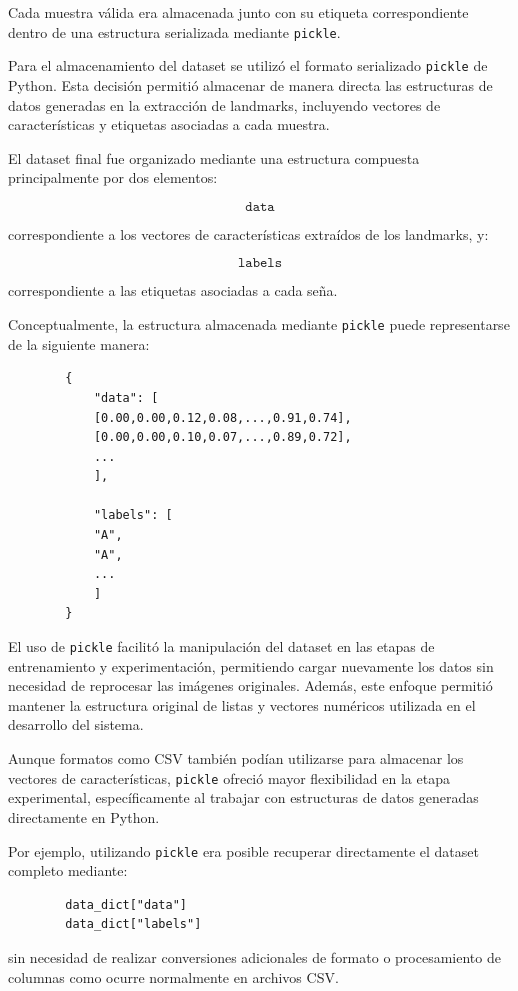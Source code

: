 	Cada muestra válida era almacenada junto con su etiqueta correspondiente dentro
	de una estructura serializada mediante \texttt{pickle}. 
	
	Para el almacenamiento del dataset se utilizó el formato serializado
	\texttt{pickle} de Python. Esta decisión permitió almacenar de manera directa
	las estructuras de datos generadas en la extracción de landmarks,
	incluyendo vectores de características y etiquetas asociadas a cada muestra.
	
	El dataset final fue organizado mediante una estructura compuesta
	principalmente por dos elementos:
	
	\[
	\texttt{data}
	\]
	
	correspondiente a los vectores de características extraídos de los landmarks, y:
	
	\[
	\texttt{labels}
	\]
	
	correspondiente a las etiquetas asociadas a cada seña.
	
	Conceptualmente, la estructura almacenada mediante \texttt{pickle} puede
	representarse de la siguiente manera:
	
	\begin{verbatim}
		{
			"data": [
			[0.00,0.00,0.12,0.08,...,0.91,0.74],
			[0.00,0.00,0.10,0.07,...,0.89,0.72],
			...
			],
			
			"labels": [
			"A",
			"A",
			...
			]
		}
	\end{verbatim}
	
	El uso de \texttt{pickle} facilitó la manipulación del dataset en las etapas
	de entrenamiento y experimentación, permitiendo cargar nuevamente los datos sin
	necesidad de reprocesar las imágenes originales. Además, este enfoque permitió
	mantener la estructura original de listas y vectores numéricos utilizada en 
	el desarrollo del sistema.
	
	Aunque formatos como CSV también podían utilizarse para almacenar los vectores
	de características, \texttt{pickle} ofreció mayor flexibilidad en la etapa
	experimental, específicamente al trabajar con estructuras de datos generadas
	directamente en Python.
	
	Por ejemplo, utilizando \texttt{pickle} era posible recuperar directamente el
	dataset completo mediante:
	
	\begin{verbatim}
		data_dict["data"]
		data_dict["labels"]
	\end{verbatim}
	
	sin necesidad de realizar conversiones adicionales de formato o procesamiento de
	columnas como ocurre normalmente en archivos CSV.
	
